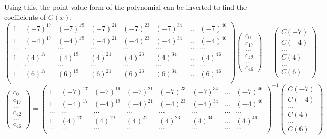\documentclass[11pt, a4paper]{article}
\begin{document}
{{{Using this, the point-value form of the polynomial can be inverted to find the coefficients of $C(x)$:
      \[ \begin{pmatrix}
          1 & (-7)^{17} & (-7)^{19} & (-7)^{21} & (-7)^{23} & (-7)^{34} & \dots & (-7)^{46}\\
          1 & (-4)^{17} & (-4)^{19} & (-4)^{21} & (-4)^{23} & (-4)^{34} & \dots & (-4)^{46}\\
          \dots & \dots & \dots & \dots & \dots & \dots & \dots & \dots\\
          1 & (4)^{17} & (4)^{19} & (4)^{21} & (4)^{23} & (4)^{34} & \dots & (4)^{46}\\
          \dots & \dots & \dots & \dots & \dots & \dots & \dots & \dots\\
          1 & (6)^{17} & (6)^{19} & (6)^{21} & (6)^{23} & (6)^{34} & \dots & (6)^{46}\\
        \end{pmatrix} 
         \begin{pmatrix}
           c_0 \\ c_{17} \\ \dots \\ c_{42} \\ \dots \\ c_{46}
        \end{pmatrix} =
        \begin{pmatrix}
          C(-7) \\ C(-4) \\ \dots \\ C(4) \\ \dots \\ C(6)
      \end{pmatrix} \]
 \[ \begin{pmatrix}
           c_0 \\ c_{17} \\ \dots \\ c_{42} \\ \dots \\ c_{46}
        \end{pmatrix} =
        \begin{pmatrix}
          1 & (-7)^{17} & (-7)^{19} & (-7)^{21} & (-7)^{23} & (-7)^{34} & \dots & (-7)^{46}\\
          1 & (-4)^{17} & (-4)^{19} & (-4)^{21} & (-4)^{23} & (-4)^{34} & \dots & (-4)^{46}\\
          \dots & \dots & \dots & \dots & \dots & \dots & \dots & \dots\\
          1 & (4)^{17} & (4)^{19} & (4)^{21} & (4)^{23} & (4)^{34} & \dots & (4)^{46}\\
          \dots & \dots & \dots & \dots & \dots & \dots & \dots & \dots\\
        \end{pmatrix}^{-1}
        \begin{pmatrix}
          C(-7) \\ C(-4) \\ \dots \\ C(4) \\ \dots \\ C(6)
      \end{pmatrix} \]

}}}
\end{document}
